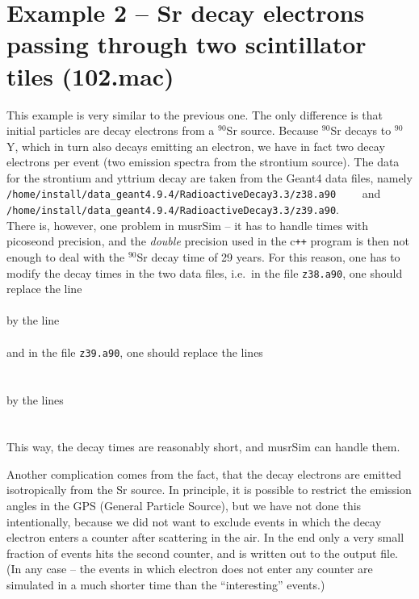 \documentclass[twoside]{dis04}
\begin{document}
\section{Example 2 -- Sr decay electrons passing through two scintillator tiles (102.mac)}
This example is very similar to the previous one.  The only difference is that initial
particles are decay electrons from a $^{90}$Sr source.  Because $^{90}$Sr decays to $^{90}$Y,
which in turn also decays emitting an electron, we have in fact two decay electrons per event
(two emission spectra from the strontium source).
The data for the strontium and yttrium decay are taken
from the Geant4 data files, namely\\
{\tt /home/install/data\_geant4.9.4/RadioactiveDecay3.3/z38.a90}~~~~ and\\
{\tt /home/install/data\_geant4.9.4/RadioactiveDecay3.3/z39.a90}. \\
There is, however, one problem in musrSim -- it has to handle times with picoseond precision,
and the \emph{double} precision used in the c{\tt ++} program is then not enough to deal with 
the $^{90}$Sr decay time of 29 years.  
For this reason, one has to modify the decay times in the two data files, i.e.\
in the file {\tt z38.a90}, one should replace the line\\
\hspace*{1cm}{\tt P~~~~~~~0.0000~~~9.0820e+08}\\ 
by the line\\
\hspace*{1cm}{\tt P~~~~~~~0.0000~~~9.0820e-08}\\[2ex]
and in the file {\tt z39.a90}, one should replace the lines\\
\hspace*{1cm}{\tt P~~~~~~~0.0000~~~2.3080e+05}\\
\hspace*{1cm}{\tt P~~~~~682.0300~~~1.1480e+04}\\
by the lines\\
\hspace*{1cm}{\tt P~~~~~~~0.0000~~~2.3080e-05}\\
\hspace*{1cm}{\tt P~~~~~682.0300~~~1.1480e-04}\\
This way, the decay times are reasonably short, and musrSim can handle them.

Another complication comes from the fact, that the decay electrons are emitted
isotropically from the Sr source.  In principle, it is possible to restrict the
emission angles in the GPS (General Particle Source), but we have not done this
intentionally, because we did not want to exclude events in which the decay electron
enters a counter after scattering in the air.  In the end only a very small fraction
of events hits the second counter, and is written out to the output file.  
(In any case -- the events in which electron does not enter any counter are simulated in a much
shorter time than the ``interesting'' events.)
\end{document}
